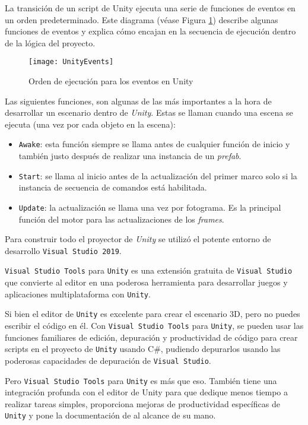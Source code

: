 La transición de un script de Unity ejecuta una serie de funciones de eventos en un orden predeterminado. Este diagrama (véase Figura \ref{fig:UnityEvents}) describe algunas funciones de eventos y explica cómo encajan en la secuencia de ejecución dentro de la lógica del proyecto.


\begin{figure}[h]
    \centering 
    \texttt{[image: UnityEvents]}
    \caption{Orden de ejecución para los eventos en Unity}
    \label{fig:UnityEvents} 
\end{figure} 

Las siguientes funciones, son algunas de las más importantes a la hora de desarrollar un escenario dentro de \textit{Unity}. Estas se llaman cuando una escena se ejecuta (una vez por cada objeto en la escena): 

\begin{itemize}
	\item \texttt{Awake}: esta función siempre se llama antes de cualquier función de inicio y también justo después de realizar una instancia de un \textit{prefab}.
 	\item \texttt{Start}: se llama al inicio antes de la actualización del primer marco solo si la instancia de secuencia de comandos está habilitada.
    \item \texttt{Update}: la actualización se llama una vez por fotograma. Es la principal función del motor para las actualizaciones de los \textit{frames}.
\end{itemize} 

Para construir todo el proyector de \textit{Unity} se utilizó el potente entorno de desarrollo \texttt{Visual Studio 2019}. 

\texttt{Visual Studio Tools} para \texttt{Unity} es una extensión gratuita de \texttt{Visual Studio} que convierte al editor en una poderosa herramienta para desarrollar juegos y aplicaciones multiplataforma con \texttt{Unity}.

Si bien el editor de \texttt{Unity} es excelente para crear el escenario 3D, pero no puedes escribir el código en él. Con \texttt{Visual Studio Tools} para \texttt{Unity}, se pueden usar las funciones familiares de edición, depuración y productividad de código para crear scripts en el proyecto de \texttt{Unity} usando C\#, pudiendo depurarlos usando las poderosas capacidades de depuración de \texttt{Visual Studio}.

Pero \texttt{Visual Studio Tools} para \texttt{Unity} es más que eso. También tiene una integración profunda con el editor de Unity para que dedique menos tiempo a realizar tareas simples, proporciona mejoras de productividad específicas de \texttt{Unity} y pone la documentación de al alcance de su mano.

